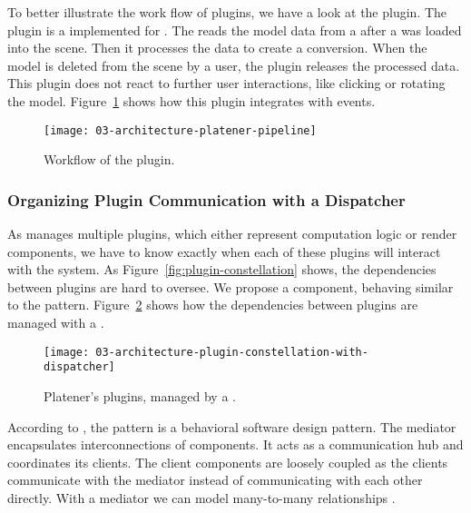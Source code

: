 \documentclass[../../ClassicThesis.tex]{subfiles}
\begin{document}
To better illustrate the work flow of plugins, we have a look at the
 plugin. The  plugin is
a  implemented for {\platener}. The  reads
the model data from a  after a {\threedmodel} was loaded
into the scene. Then it processes the data to create a {\lasercutter}
conversion. When the model is deleted from the scene by a user, the
plugin releases the processed data. This plugin does not react to
further user interactions, like clicking or rotating the model.
Figure~\ref{fig:workflow-platener-pipeline} shows how this plugin
integrates with {\convertify} events.

\begin{figure}[h]
  \centering
  \texttt{[image: 03-architecture-platener-pipeline]}
  \caption{Workflow of the  plugin.}
  \label{fig:workflow-platener-pipeline}
\end{figure}

\subsubsection{Organizing Plugin Communication with a
  Dispatcher}


As {\convertify} manages multiple plugins, which either represent
computation logic or render components, we have to know exactly when
each of these plugins will interact with the system. As
Figure~\ref{fig:plugin-constellation} shows, the dependencies between
plugins are hard to oversee. We propose a 
component, behaving similar to the  pattern.
Figure~\ref{fig:plugin-constellation-with-dispatcher} shows how the
dependencies between plugins are managed with a .

\begin{figure}[h]
  \centering
  \texttt{[image: 03-architecture-plugin-constellation-with-dispatcher]}
  \caption{Platener's plugins, managed by a .}
  \label{fig:plugin-constellation-with-dispatcher}
\end{figure}

According to \citeauthor{gof}, the  pattern is a
behavioral software design pattern. The mediator encapsulates
interconnections of components. It acts as a communication hub and
coordinates its clients. The client components are loosely coupled as
the clients communicate with the mediator instead of communicating
with each other directly. With a mediator we can model many-to-many
relationships \cite[p. 273]{gof}.
\end{document}
